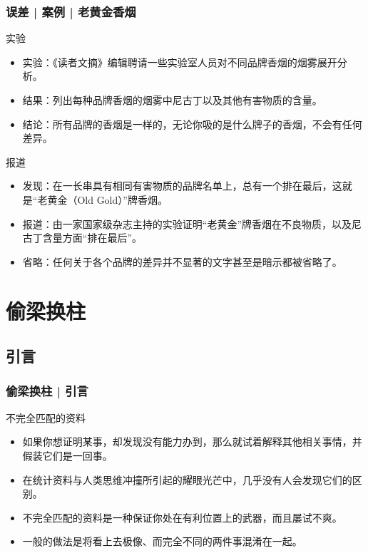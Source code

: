 \begin{frame}
  \frametitle{误差 | 案例 | 老黄金香烟}
  \begin{block}{实验}
    \begin{itemize}
      \item 实验：《读者文摘》编辑聘请一些实验室人员对不同品牌香烟的烟雾展开分析。
      \item 结果：列出每种品牌香烟的烟雾中尼古丁以及其他有害物质的含量。
      \item 结论：所有品牌的香烟是一样的，无论你吸的是什么牌子的香烟，不会有任何差异。
    \end{itemize}
  \end{block}
  \vspace{-0.3em}
  \pause
  \begin{block}{报道}
    \begin{itemize}
      \item 发现：在一长串具有相同有害物质的品牌名单上，总有一个排在最后，这就是“老黄金（Old Gold）”牌香烟。
      \item 报道：由一家国家级杂志主持的实验证明“老黄金”牌香烟在不良物质，以及尼古丁含量方面“排在最后”。
      \item 省略：任何关于各个品牌的差异并不显著的文字甚至是暗示都被省略了。
    \end{itemize}
  \end{block}
\end{frame}

\section{偷梁换柱}
\subsection{引言}
\begin{frame}
  \frametitle{偷梁换柱 | 引言}
  \begin{block}{不完全匹配的资料}
    \begin{itemize}
      \item 如果你想证明某事，却发现没有能力办到，那么就试着解释其他相关事情，并假装它们是一回事。
      \item 在统计资料与人类思维冲撞所引起的耀眼光芒中，几乎没有人会发现它们的区别。
      \item 不完全匹配的资料是一种保证你处在有利位置上的武器，而且屡试不爽。
      \item 一般的做法是将看上去极像、而完全不同的两件事混淆在一起。
    \end{itemize}
  \end{block}
\end{frame}

